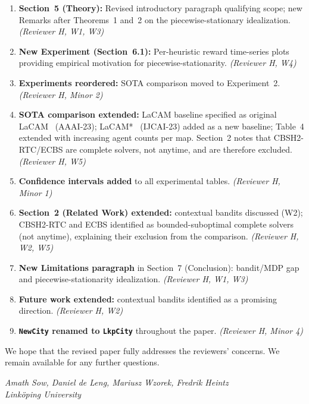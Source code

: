 \documentclass[review]{jair}
\begin{document}
\begin{enumerate}[leftmargin=2em, label=\textbf{C\arabic*}]
  \item \textbf{Section~5 (Theory):} Revised introductory paragraph qualifying scope; new Remarks after Theorems~1 and~2 on the piecewise-stationary idealization. \emph{(Reviewer H, W1, W3)}

  \item \textbf{New Experiment (Section~6.1):} Per-heuristic reward time-series plots providing empirical motivation for piecewise-stationarity. \emph{(Reviewer H, W4)}

  \item \textbf{Experiments reordered:} SOTA comparison moved to Experiment~2. \emph{(Reviewer H, Minor 2)}

  \item \textbf{SOTA comparison extended:} LaCAM baseline specified as original LaCAM~\citep{LaCam} (AAAI-23); LaCAM*~\citep{LaCamStar} (IJCAI-23) added as a new baseline; Table~4 extended with increasing agent counts per map. Section~2 notes that CBSH2-RTC/ECBS are complete solvers, not anytime, and are therefore excluded. \emph{(Reviewer H, W5)}

  \item \textbf{Confidence intervals added} to all experimental tables. \emph{(Reviewer H, Minor 1)}

  \item \textbf{Section~2 (Related Work) extended:} contextual bandits discussed (W2); CBSH2-RTC and ECBS identified as bounded-suboptimal complete solvers (not anytime), explaining their exclusion from the comparison. \emph{(Reviewer H, W2, W5)}

  \item \textbf{New Limitations paragraph} in Section~7 (Conclusion): bandit/MDP gap and piecewise-stationarity idealization. \emph{(Reviewer H, W1, W3)}

  \item \textbf{Future work extended:} contextual bandits identified as a promising direction. \emph{(Reviewer H, W2)}

  \item \textbf{\texttt{NewCity} renamed to \texttt{LkpCity}} throughout the paper. \emph{(Reviewer H, Minor 4)}

\end{enumerate}

\bigskip
\noindent We hope that the revised paper fully addresses the reviewers' concerns. We remain available for any further questions.

\medskip
\noindent\textit{Amath Sow, Daniel de Leng, Mariusz Wzorek, Fredrik Heintz}\\
\textit{Linköping University}



\end{document}
